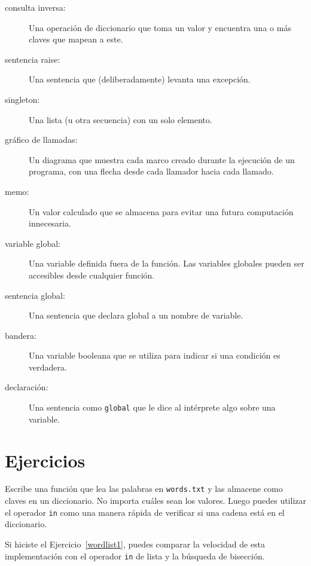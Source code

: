 \documentclass[10pt]{book}
\begin{document}
\begin{description}
\item[consulta inversa:] Una operación de diccionario que toma un valor y encuentra
una o más claves que mapean a este.

\item[sentencia raise:]  Una sentencia que (deliberadamente) levanta una excepción.

\item[singleton:] Una lista (u otra secuencia) con un solo elemento.

\item[gráfico de llamadas:] Un diagrama que muestra cada marco creado durante
la ejecución de un programa, con una flecha desde cada llamador
hacia cada llamado.

\item[memo:] Un valor calculado que se almacena para evitar una futura
computación innecesaria.

\item[variable global:]  Una variable definida fuera de la función. Las
variables globales pueden ser accesibles desde cualquier función.

\item[sentencia global:]  Una sentencia que declara global a un nombre
de variable.

\item[bandera:] Una variable booleana que se utiliza para indicar si una condición
es verdadera.

\item[declaración:] Una sentencia como {\tt global} que le dice al
intérprete algo sobre una variable.

\end{description}


\section{Ejercicios}

\begin{exercise}
\label{wordlist2}

Escribe una función que lea las palabras en {\tt words.txt} y
las almacene como claves en un diccionario.  No importa cuáles sean
los valores.  Luego puedes utilizar el operador {\tt in}
como una manera rápida de verificar si una cadena está en
el diccionario.

Si hiciste el Ejercicio~\ref{wordlist1}, puedes comparar la velocidad
de esta implementación con el operador {\tt in} de lista y la
búsqueda de bisección.

\end{exercise}
\end{document}
